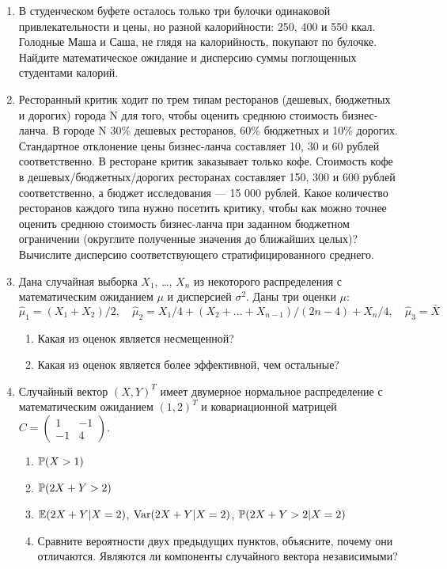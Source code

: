 \documentclass[12pt, a4paper]{article}\usepackage[]{graphicx}\usepackage[]{color}
\begin{document}
\begin{enumerate}

\item В студенческом буфете осталось только три булочки одинаковой привлекательности и цены, но разной калорийности: 250, 400 и 550 ккал. Голодные Маша и Саша, не глядя на калорийность, покупают по булочке. Найдите математическое ожидание и дисперсию суммы поглощенных студентами калорий.

\item Ресторанный критик ходит по трем типам ресторанов (дешевых, бюджетных и дорогих) города N для того, чтобы оценить среднюю стоимость бизнес-ланча. В городе N 30\% дешевых ресторанов, 60\% бюджетных  и 10\% дорогих. Стандартное отклонение цены бизнес-ланча составляет 10, 30 и 60 рублей соответственно. В ресторане критик заказывает только кофе.  Стоимость кофе в дешевых/бюджетных/дорогих ресторанах составляет 150, 300 и 600 рублей соответственно, а бюджет  исследования — 15 000 рублей. Какое количество ресторанов каждого типа нужно посетить критику, чтобы как можно точнее оценить среднюю стоимость бизнес-ланча при заданном бюджетном ограничении (округлите полученные значения до ближайших целых)? Вычислите дисперсию соответствующего стратифицированного среднего.

\item Дана случайная выборка $X_1$, \ldots, $X_n$  из некоторого распределения с математическим ожиданием $\mu$ и дисперсией $\sigma^2$. Даны три оценки $\mu$:
 \[
\hat\mu_1 = (X_1 + X_2)/2, \quad \hat\mu_2 = X_1/4 + (X_2 + \ldots + X_{n-1})/(2n-4) + X_n/4, \quad \hat\mu_3 = \bar X
 \]
\begin{enumerate}
\item Какая из оценок является несмещенной?
\item Какая из оценок является более эффективной, чем остальные?
\end{enumerate}

\item Случайный вектор $(X, Y)^T$ имеет двумерное нормальное распределение с математическим ожиданием  $(1, 2)^T$ и ковариационной матрицей
$C=\begin{pmatrix}
1 & -1 \\
-1 & 4
\end{pmatrix}$.
\begin{enumerate}
\item $\P(X>1)$
\item $\P(2X+Y>2)$
\item $\E(2X+Y|X=2)$, $\Var(2X+Y|X=2)$, $\P(2X+Y>2|X=2)$
\item Сравните вероятности двух предыдущих пунктов, объясните, почему они отличаются.
Являются ли компоненты случайного вектора независимыми?
\end{enumerate}



\end{enumerate}
\end{document}
